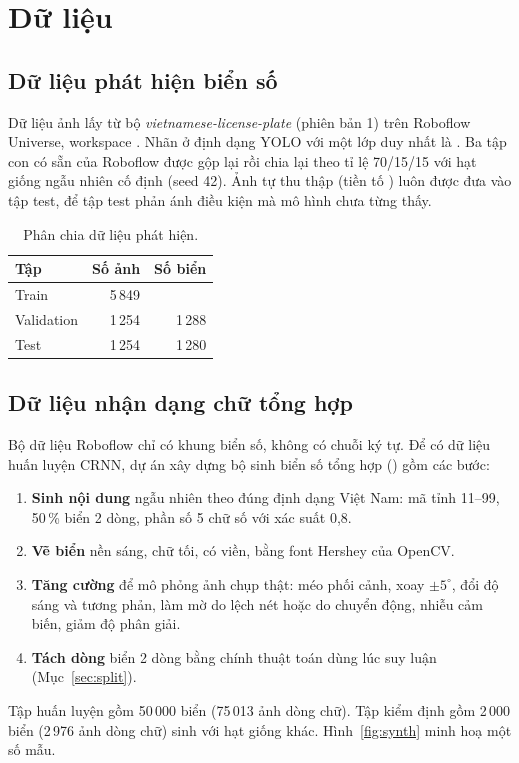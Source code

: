 \section{Dữ liệu}

\subsection{Dữ liệu phát hiện biển số}
Dữ liệu ảnh lấy từ bộ \emph{vietnamese-license-plate} (phiên bản 1) trên Roboflow Universe, workspace . Nhãn ở định dạng YOLO với một lớp duy nhất là . Ba tập con có sẵn của Roboflow được gộp lại rồi chia lại theo tỉ lệ 70/15/15 với hạt giống ngẫu nhiên cố định (seed 42). Ảnh tự thu thập (tiền tố ) luôn được đưa vào tập test, để tập test phản ánh điều kiện mà mô hình chưa từng thấy.

\begin{table}[H]
\centering
\caption{Phân chia dữ liệu phát hiện.}
\label{tab:split}
\begin{tabular}{lrr}
\toprule
Tập & Số ảnh & Số biển \\
\midrule
Train & 5\,849 & \todo{?} \\
Validation & 1\,254 & 1\,288 \\
Test & 1\,254 & 1\,280 \\
\bottomrule
\end{tabular}
\end{table}

\subsection{Dữ liệu nhận dạng chữ tổng hợp}
Bộ dữ liệu Roboflow chỉ có khung biển số, không có chuỗi ký tự. Để có dữ liệu huấn luyện CRNN, dự án xây dựng bộ sinh biển số tổng hợp () gồm các bước:
\begin{enumerate}[nosep]
  \item \textbf{Sinh nội dung} ngẫu nhiên theo đúng định dạng Việt Nam: mã tỉnh 11--99, 50\,\% biển 2 dòng, phần số 5 chữ số với xác suất 0,8.
  \item \textbf{Vẽ biển} nền sáng, chữ tối, có viền, bằng font Hershey của OpenCV.
  \item \textbf{Tăng cường} để mô phỏng ảnh chụp thật: méo phối cảnh, xoay $\pm 5^\circ$, đổi độ sáng và tương phản, làm mờ do lệch nét hoặc do chuyển động, nhiễu cảm biến, giảm độ phân giải.
  \item \textbf{Tách dòng} biển 2 dòng bằng chính thuật toán dùng lúc suy luận (Mục~\ref{sec:split}).
\end{enumerate}
Tập huấn luyện gồm 50\,000 biển (75\,013 ảnh dòng chữ). Tập kiểm định gồm 2\,000 biển (2\,976 ảnh dòng chữ) sinh với hạt giống khác. Hình~\ref{fig:synth} minh hoạ một số mẫu.

